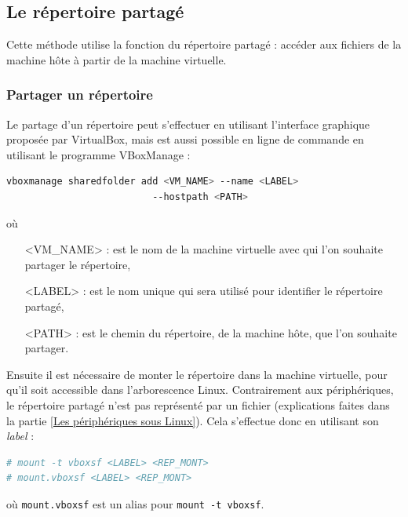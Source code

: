 \subsection{Le répertoire partagé}

Cette méthode utilise la fonction du répertoire partagé : accéder aux fichiers de la machine hôte à partir de la machine virtuelle.
\\




\subsubsection{Partager un répertoire}

Le partage d'un répertoire peut s'effectuer en utilisant l'interface graphique proposée par VirtualBox, mais est aussi possible en ligne de commande en utilisant le programme VBoxManage :
\begin{lstlisting}[language = sh]
vboxmanage sharedfolder add <VM_NAME> --name <LABEL>
                          --hostpath <PATH>
\end{lstlisting}
où 
\begin{itemize}
	\item[<VM\_NAME> :] est le nom de la machine virtuelle avec qui l'on souhaite partager le répertoire,
	\item[<LABEL> :] est le nom unique qui sera utilisé pour identifier le répertoire partagé,
	\item[<PATH> :] est le chemin du répertoire, de la machine hôte, que l'on souhaite partager.
\\
\end{itemize}


Ensuite il est nécessaire de monter le répertoire dans la machine virtuelle, pour qu'il soit accessible dans l'arborescence Linux.
Contrairement aux périphériques, le répertoire partagé n'est pas représenté par un fichier (explications faites dans la partie \ref{Les périphériques sous Linux}).
Cela s'effectue donc en utilisant son \textit{label} :
\begin{lstlisting}[language = sh]
# mount -t vboxsf <LABEL> <REP_MONT>
# mount.vboxsf <LABEL> <REP_MONT>
\end{lstlisting}
où \lstinline{mount.vboxsf} est un alias pour \lstinline{mount -t vboxsf}.
~~\\



